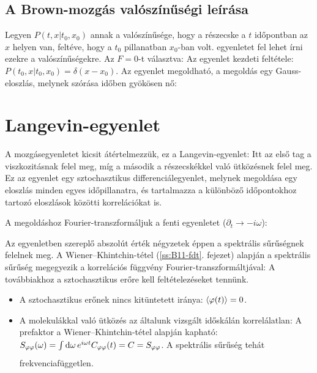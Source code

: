   \subsection{A Brown-mozgás valószínűségi leírása}
   
   Legyen $P(t,x|t_0,x_0)$ annak a valószínűsége, hogy a részecske a $t$ időpontban az $x$ helyen van, feltéve, hogy a $t_0$ pillanatban $x_0$-ban volt.  egyenletet fel lehet írni ezekre a valószínűségekre. Az $F=0$-t választva:
   Az egyenlet kezdeti feltétele: $P(t_0,x|t_0,x_0)=\delta(x-x_0)$. Az egyenlet megoldható, a megoldás egy Gauss-eloszlás, melynek szórása időben gyökösen nő:
   
 \section{Langevin-egyenlet}
  
  A mozgásegyenletet kicsit átértelmezzük, ez a Langevin-egyenlet:
  Itt az első tag a viszkozitásnak felel meg, míg a második a részecskékkel való ütközésnek felel meg. Ez az egyenlet egy sztochasztikus differenciálegyenlet, melynek megoldása egy eloszlás minden egyes időpillanatra, és tartalmazza a különböző időpontokhoz tartozó eloszlások közötti korrelációkat is. 
  
  A megoldáshoz Fourier-transzformáljuk a fenti egyenletet ($\partial_t\to -i\omega$):
  
  Az egyenletben szereplő abszolút érték négyzetek éppen a spektrális sűrűségnek felelnek meg. A Wiener--Khintchin-tétel (\ref{ss:B11-fdt}. fejezet) alapján a spektrális sűrűség megegyezik a korrelációs függvény Fourier-transzformáltjával:
  A továbbiakhoz a sztochasztikus erőre kell feltételezéseket tennünk. 
  \begin{itemize}
   \item A sztochasztikus erőnek nincs kitüntetett iránya: $\left\langle\varphi(t)\right\rangle=0$.
   \item A molekulákkal való ütközés az általunk vizsgált időskálán korrelálatlan: 
   A prefaktor a Wiener--Khintchin-tétel alapján kapható: $S_{\varphi\varphi}(\omega)=\int\limits_{}^{}\mathrm{d}\omega\,e^{i\omega t}C_{\varphi\varphi}(t)=C=S_{\varphi\varphi}$. A spektrális sűrűség tehát frekvenciafüggetlen.
  \end{itemize}
  
